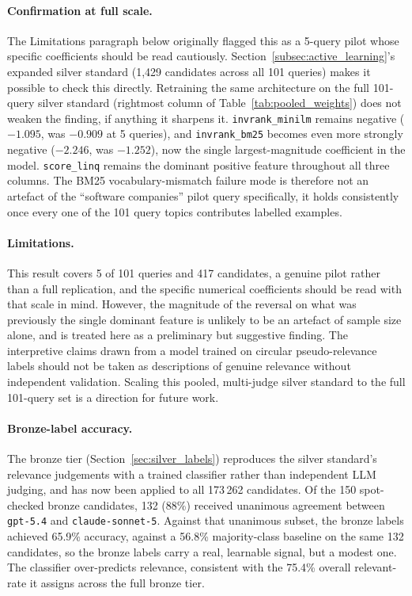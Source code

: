 \documentclass[a4paper,oneside,bibliography=totoc]{scrbook}
\begin{document}
\paragraph{Confirmation at full scale.} The Limitations paragraph below originally flagged this as a 5-query pilot whose specific coefficients should be read cautiously. Section~\ref{subsec:active_learning}'s expanded silver standard (1{,}429 candidates across all 101 queries) makes it possible to check this directly. Retraining the same architecture on the full 101-query silver standard (rightmost column of Table~\ref{tab:pooled_weights}) does not weaken the finding, if anything it sharpens it. \texttt{invrank\_minilm} remains negative ($-1.095$, was $-0.909$ at 5 queries), and \texttt{invrank\_bm25} becomes even more strongly negative ($-2.246$, was $-1.252$), now the single largest-magnitude coefficient in the model. \texttt{score\_linq} remains the dominant positive feature throughout all three columns. The BM25 vocabulary-mismatch failure mode is therefore not an artefact of the ``software companies'' pilot query specifically, it holds consistently once every one of the 101 query topics contributes labelled examples.

\paragraph{Limitations.} This result covers 5 of 101 queries and 417 candidates, a genuine pilot rather than a full replication, and the specific numerical coefficients should be read with that scale in mind. However, the magnitude of the reversal on what was previously the single dominant feature is unlikely to be an artefact of sample size alone, and is treated here as a preliminary but suggestive finding. The interpretive claims drawn from a model trained on circular pseudo-relevance labels should not be taken as descriptions of genuine relevance without independent validation. Scaling this pooled, multi-judge silver standard to the full 101-query set is a direction for future work.

\label{sec:silver_labels_result}

\paragraph{Bronze-label accuracy.} The bronze tier (Section~\ref{sec:silver_labels}) reproduces the silver standard's relevance judgements with a trained classifier rather than independent LLM judging, and has now been applied to all 173\,262 candidates. Of the 150 spot-checked bronze candidates, 132 (88\%) received unanimous agreement between \texttt{gpt-5.4} and \texttt{claude-sonnet-5}. Against that unanimous subset, the bronze labels achieved 65.9\% accuracy, against a 56.8\% majority-class baseline on the same 132 candidates, so the bronze labels carry a real, learnable signal, but a modest one. The classifier over-predicts relevance, consistent with the 75.4\% overall relevant-rate it assigns across the full bronze tier.
\end{document}
